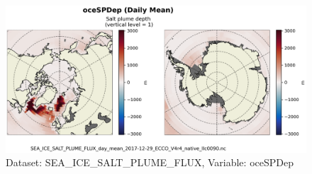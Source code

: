 \begin{figure}[H]
\centering
\includegraphics[scale=0.55]{../images/plots/native_plots/Sea-Ice_Salt_Plume_Fluxes/oceSPDep.png}
\caption{Dataset: SEA\_ICE\_SALT\_PLUME\_FLUX, Variable: oceSPDep}
\label{tab:table-SEA_ICE_SALT_PLUME_FLUX_oceSPDep-Plot}
\end{figure}
\newpage
\pagebreak
